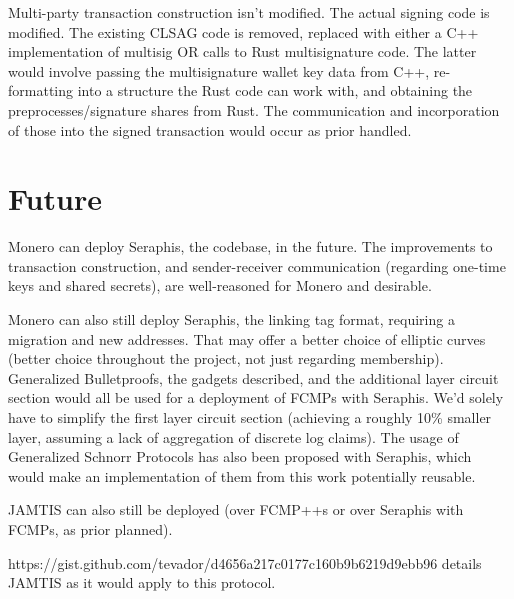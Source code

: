 \documentclass[]{article}
\begin{document}
Multi-party transaction construction isn't modified. The actual signing code is modified. The existing CLSAG code is removed, replaced with either a C++ implementation of multisig OR calls to Rust multisignature code. The latter would involve passing the multisignature wallet key data from C++, re-formatting into a structure the Rust code can work with, and obtaining the preprocesses/signature shares from Rust. The communication and incorporation of those into the signed transaction would occur as prior handled.

\newpage

\section{Future}

Monero can deploy Seraphis, the codebase, in the future. The improvements to transaction construction, and sender-receiver communication (regarding one-time keys and shared secrets), are well-reasoned for Monero and desirable.

Monero can also still deploy Seraphis, the linking tag format, requiring a migration and new addresses. That may offer a better choice of elliptic curves (better choice throughout the project, not just regarding membership). Generalized Bulletproofs, the gadgets described, and the additional layer circuit section would all be used for a deployment of FCMPs with Seraphis. We'd solely have to simplify the first layer circuit section (achieving a roughly 10\% smaller layer, assuming a lack of aggregation of discrete log claims). The usage of Generalized Schnorr Protocols has also been proposed with Seraphis, which would make an implementation of them from this work potentially reusable.

JAMTIS can also still be deployed (over FCMP++s or over Seraphis with FCMPs, as prior planned).

https://gist.github.com/tevador/d4656a217c0177c160b9b6219d9ebb96 details JAMTIS as it would apply to this protocol.
\end{document}
